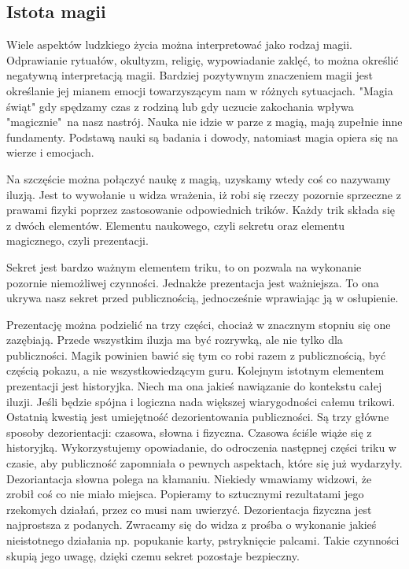 \documentclass{article}
\numberwithin{equation}{section}
\begin{document}
\subsection{Istota magii}
Wiele aspektów ludzkiego życia można interpretować jako rodzaj magii. Odprawianie rytuałów, okultyzm, religię, wypowiadanie zaklęć, to można określić negatywną interpretacją magii. Bardziej pozytywnym znaczeniem magii jest określanie jej mianem emocji towarzyszącym nam w różnych sytuacjach. "Magia świąt" gdy spędzamy czas z rodziną lub gdy uczucie zakochania wpływa "magicznie"\ na nasz nastrój. Nauka nie idzie w parze z magią, mają zupełnie inne fundamenty. Podstawą nauki są badania i dowody, natomiast magia opiera się na wierze i emocjach.\par Na szczęście można połączyć naukę z magią, uzyskamy wtedy coś co nazywamy iluzją. Jest to wywołanie u widza wrażenia, iż robi się rzeczy pozornie sprzeczne z prawami fizyki poprzez zastosowanie odpowiednich trików. Każdy trik składa się z dwóch elementów. Elementu naukowego, czyli sekretu oraz elementu magicznego, czyli prezentacji.\par Sekret jest bardzo ważnym elementem triku, to on pozwala na wykonanie pozornie niemożliwej czynności. Jednakże prezentacja jest ważniejsza. To ona ukrywa nasz sekret przed publicznością, jednocześnie wprawiając ją w osłupienie.\par Prezentację można podzielić na trzy części, chociaż w znacznym stopniu się one zazębiają. Przede wszystkim iluzja ma być rozrywką, ale nie tylko dla publiczności. Magik powinien bawić się tym co robi razem z publicznością, być częścią pokazu, a nie wszystkowiedzącym guru. Kolejnym istotnym elementem prezentacji jest historyjka. Niech ma ona jakieś nawiązanie do kontekstu całej iluzji. Jeśli będzie spójna i logiczna nada większej wiarygodności całemu trikowi. Ostatnią kwestią jest umiejętność dezorientowania publiczności. Są trzy główne sposoby dezorientacji: czasowa, słowna i fizyczna. Czasowa ściśle wiąże się z historyjką. Wykorzystujemy opowiadanie, do odroczenia następnej części triku w czasie, aby publiczność zapomniała o pewnych aspektach, które się już wydarzyły. Dezoriantacja słowna polega na kłamaniu. Niekiedy wmawiamy widzowi, że zrobił coś co nie miało miejsca. Popieramy to sztucznymi rezultatami jego rzekomych działań, przez co musi nam uwierzyć. Dezorientacja fizyczna jest najprostsza z podanych. Zwracamy się do widza z prośba o wykonanie jakieś nieistotnego działania np. popukanie karty, pstryknięcie palcami. Takie czynności skupią jego uwagę, dzięki czemu sekret pozostaje bezpieczny.
\end{document}
